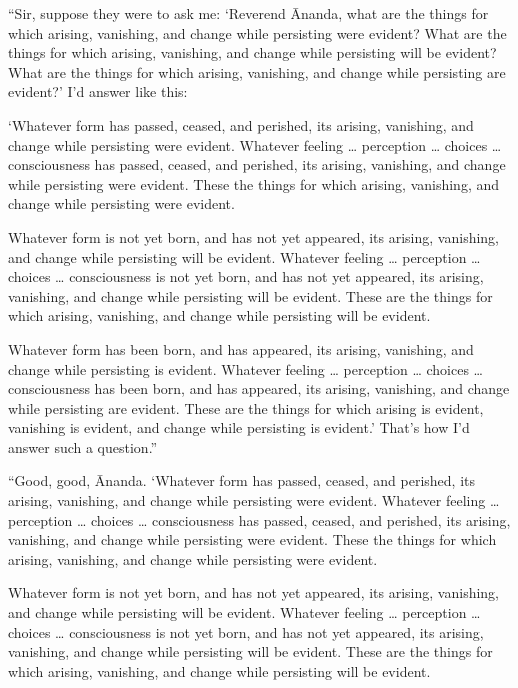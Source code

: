 \documentclass[12pt,openany]{book}%
\begin{document}
“Sir, suppose they were to ask me: ‘Reverend Ānanda, what are the things for which arising, vanishing, and change while persisting were evident? What are the things for which arising, vanishing, and change while persisting will be evident? What are the things for which arising, vanishing, and change while persisting are evident?’ I’d answer like this: 

‘Whatever form has passed, ceased, and perished, its arising, vanishing, and change while persisting were evident. Whatever feeling … perception … choices … consciousness has passed, ceased, and perished, its arising, vanishing, and change while persisting were evident. These the things for which arising, vanishing, and change while persisting were evident. 

Whatever form is not yet born, and has not yet appeared, its arising, vanishing, and change while persisting will be evident. Whatever feeling … perception … choices … consciousness is not yet born, and has not yet appeared, its arising, vanishing, and change while persisting will be evident. These are the things for which arising, vanishing, and change while persisting will be evident. 

Whatever form has been born, and has appeared, its arising, vanishing, and change while persisting is evident. Whatever feeling … perception … choices … consciousness has been born, and has appeared, its arising, vanishing, and change while persisting are evident. These are the things for which arising is evident, vanishing is evident, and change while persisting is evident.’ That’s how I’d answer such a question.” 

“Good, good, Ānanda. ‘Whatever form has passed, ceased, and perished, its arising, vanishing, and change while persisting were evident. Whatever feeling … perception … choices … consciousness has passed, ceased, and perished, its arising, vanishing, and change while persisting were evident. These the things for which arising, vanishing, and change while persisting were evident. 

Whatever form is not yet born, and has not yet appeared, its arising, vanishing, and change while persisting will be evident. Whatever feeling … perception … choices … consciousness is not yet born, and has not yet appeared, its arising, vanishing, and change while persisting will be evident. These are the things for which arising, vanishing, and change while persisting will be evident. 
\end{document}
